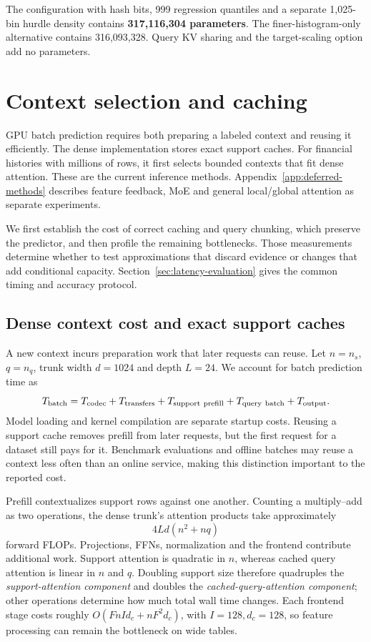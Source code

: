 \documentclass[11pt]{article}
\begin{document}
The configuration with hash bits, 999 regression quantiles and a separate 1,025-bin hurdle density contains \textbf{317,116,304 parameters}. The finer-histogram-only alternative contains 316,093,328. Query KV sharing and the target-scaling option add no parameters.


\section{Context selection and caching}
\label{sec:latency-moe}

GPU batch prediction requires both preparing a labeled context and reusing it efficiently. The dense implementation stores exact support caches. For financial histories with millions of rows, it first selects bounded contexts that fit dense attention. These are the current inference methods. Appendix~\ref{app:deferred-methods} describes feature feedback, MoE and general local/global attention as separate experiments.

We first establish the cost of correct caching and query chunking, which preserve the predictor, and then profile the remaining bottlenecks. Those measurements determine whether to test approximations that discard evidence or changes that add conditional capacity. Section~\ref{sec:latency-evaluation} gives the common timing and accuracy protocol.

\subsection{Dense context cost and exact support caches}

A new context incurs preparation work that later requests can reuse. Let $n=n_s$, $q=n_q$, trunk width $d=1024$ and depth $L=24$. We account for batch prediction time as
\[
T_{\rm batch}=T_{\rm codec}+T_{\rm transfers}+T_{\rm support\ prefill}+T_{\rm query\ batch}+T_{\rm output}.
\]
Model loading and kernel compilation are separate startup costs. Reusing a support cache removes prefill from later requests, but the first request for a dataset still pays for it. Benchmark evaluations and offline batches may reuse a context less often than an online service, making this distinction important to the reported cost.

Prefill contextualizes support rows against one another. Counting a multiply--add as two operations, the dense trunk's attention products take approximately
\[
4Ld(n^2+nq)
\]
forward FLOPs. Projections, FFNs, normalization and the frontend contribute additional work. Support attention is quadratic in $n$, whereas cached query attention is linear in $n$ and $q$. Doubling support size therefore quadruples the \emph{support-attention component} and doubles the \emph{cached-query-attention component}; other operations determine how much total wall time changes. Each frontend stage costs roughly $O(FnI d_c+nF^2d_c)$, with $I=128,d_c=128$, so feature processing can remain the bottleneck on wide tables.
\end{document}
